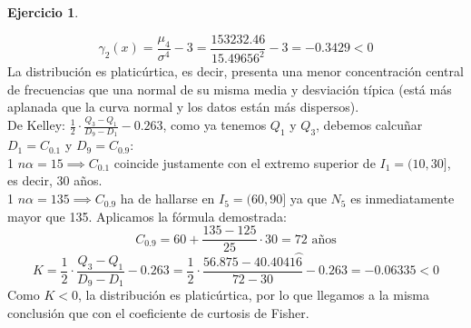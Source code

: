 \documentclass[a4paper, 12pt]{article}
\theoremstyle{definition}
\newtheorem{ej}{Ejercicio}
\begin{document}
\begin{ej}
\begin{enumerate}[label=\textit{\alph*)}]
    $$\gamma_{2}(x) = \frac{\mu_{4}}{\sigma^4} - 3=\frac{153232.46}{15.49656^2} - 3 = -0.3429 < 0$$
    La distribución es platicúrtica, es decir, presenta una menor concentración central de frecuencias que una normal de su misma media y desviación típica (está más aplanada que la curva normal y los datos están más dispersos). \\
    De Kelley: $\frac{1}{2} \cdot \frac{Q_{3}-Q_{1}}{D_{9}-D_{1}} - 0.263$, como ya tenemos $Q_{1}$ y $Q_{3}$, debemos calcuñar $D_{1} =  C_{0.1}$ y $D_{9} = C_{0.9}$: \\
    1 $n\alpha = 15 \implies C_{0.1}$ coincide justamente con el extremo superior de $I_{1} = (10,30]$, es decir, 30 años. \\
    1 $n\alpha = 135 \implies C_{0.9}$ ha de hallarse en $I_{5} = (60,90]$ ya que $N_{5}$ es inmediatamente mayor que 135. Aplicamos la fórmula demostrada: \\
    $$C_{0.9} = 60 + \frac{135 -125}{25}\cdot30 = 72 \text{ años}$$
    $$K = \frac{1}{2} \cdot \frac{Q_{3}-Q_{1}}{D_{9}-D_{1}} - 0.263 = \frac{1}{2} \cdot \frac{56.875-40.4041\wideparen{6}}{72-30} - 0.263 = -0.06335 < 0$$
    Como $K<0$, la distribución es platicúrtica, por lo que llegamos a la misma conclusión que con el coeficiente de curtosis de Fisher.
\end{enumerate}
\end{ej}
\end{document}
